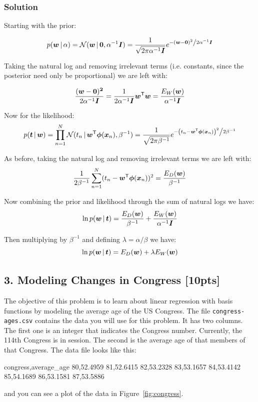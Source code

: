\documentclass[submit]{harvardml}
\begin{document}
\subsubsection*{Solution}
Starting with the prior:

$$p(\boldw \given \alpha) = \mathcal{N}(\boldw \given \bold0, \alpha^{-1}\ident ) = \frac{1}{{\sqrt {2\pi\alpha^{-1}\ident} }}e^{{{ - \left( {\boldw - \bf 0 } \right)^2 } \mathord{\left/ {\vphantom {{ - \left( {\boldw - \bf 0 } \right)^2 } {2\alpha^{-1}\ident }}} \right. \kern-\nulldelimiterspace} {2\alpha^{-1}\ident }}}$$

\noindent
Taking the natural log and removing irrelevant terms (i.e. constants, since the posterior need only be proportional) we are left with:

$$\frac{(\boldsymbol{w} - \bf 0)^2}{2\alpha^{-1}\boldsymbol{I}} = \frac{1}{2\alpha^{-1}\boldsymbol{I}}\boldsymbol{w}^{\mathsf{T}} \boldsymbol{w} = \frac{E_W(\boldsymbol{w})}{\alpha^{-1}\boldsymbol{I}}$$

\noindent
Now for the likelihood:
$$ p(\boldt \given \boldw) = \prod_{n=1}^N \mcN(t_n \given \boldw^\trans \bphi(\boldx_n), \beta^{-1}) = \frac{1}{{\sqrt {2\pi\beta^{-1}} }}e^{{{ - \left( {t_n - \boldw^\trans \bphi(\boldx_n) } \right)^2 } \mathord{\left/ {\vphantom {{ - \left( {t_n - \boldw^\trans \bphi(\boldx_n) } \right)^2 } {2\beta^{-1} }}} \right. \kern-\nulldelimiterspace} {2\beta^{-1} }}} $$

\noindent
As before, taking the natural log and removing irrelevant terms we are left with:
$$ \frac{1}{2\beta^{-1}}\sum_{n = 1}^N (t_n - \boldsymbol{w}^{\mathsf{T}} \boldsymbol{\phi}(\boldsymbol{x}_n))^2 = \frac{E_D(\boldsymbol{w})}{\beta^{-1}} $$

\noindent
Now combining the prior and likelihood through the sum of natural logs we have:
$$ \ln p(\boldsymbol{w} \,|\, \boldsymbol{t}) = \frac{E_D(\boldsymbol{w})}{\beta^{-1}} + \frac{E_W(\boldsymbol{w})}{\alpha^{-1}\boldsymbol{I}}$$

\noindent
Then multiplying by $\beta^{-1}$ and defining $\lambda = \alpha/\beta$ we have:
$$ \ln p(\boldsymbol{w} \,|\, \boldsymbol{t}) = E_D(\boldsymbol{w}) + \lambda E_W(\boldsymbol{w}) $$


\newpage
\subsection*{3. Modeling Changes in Congress [10pts]}
 The objective of this problem is to learn about linear regression with basis
 functions by modeling the average age of the US Congress. The file
 \verb|congress-ages.csv| contains the data you will use for this problem.  It
 has two columns.  The first one is an integer that indicates the Congress
 number. Currently, the 114th Congress is in session. The second is the average
 age of that members of that Congress.  The data file looks like this:
\begin{csv}
congress,average_age
80,52.4959
81,52.6415
82,53.2328
83,53.1657
84,53.4142
85,54.1689
86,53.1581
87,53.5886
\end{csv}
and you can see a plot of the data in Figure~\ref{fig:congress}.
\end{document}
